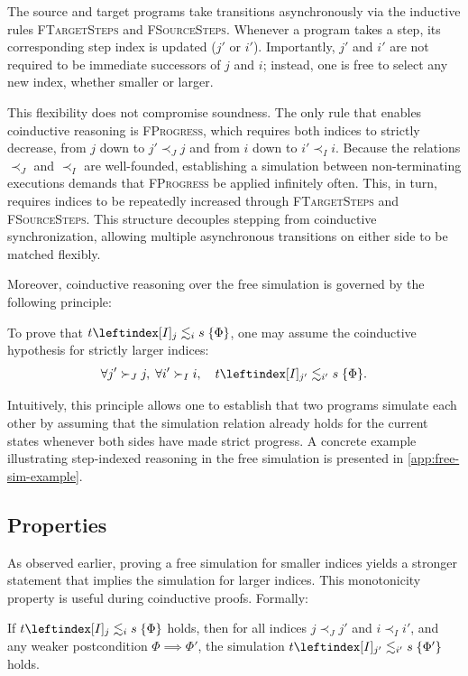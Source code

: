 \documentclass[report.tex]{subfiles}
\begin{document}
The source and target programs take transitions asynchronously
via the inductive rules \textsc{FTargetSteps} and \textsc{FSourceSteps}.
Whenever a program takes a step,
its corresponding step index is updated ($j'$ or $i'$).
Importantly,
$j'$ and $i'$ are not required to be
immediate successors of $j$ and $i$;
instead,
one is free to select any new index,
whether smaller or larger.

This flexibility does not compromise soundness.
The only rule that enables coinductive reasoning is \textsc{FProgress},
which requires both indices to strictly decrease,
from $j$ down to $j' \prec_J j$
and from $i$ down to $i' \prec_I i$.
Because the relations $\prec_J$ and $\prec_I$ are well-founded,
establishing a simulation between non-terminating executions
demands that \textsc{FProgress} be applied infinitely often.
This,
in turn,
requires indices to be repeatedly increased
through \textsc{FTargetSteps} and \textsc{FSourceSteps}.
This structure decouples stepping from coinductive synchronization,
allowing multiple asynchronous transitions
on either side to be matched flexibly.

Moreover,
coinductive reasoning over the free simulation
is governed by the following principle:
\begin{lemma}
  \label{lem:fsim-coind}
  To prove that $\fsim{t}{j}{i}{s}{\Phi}$,
  one may assume the coinductive hypothesis for strictly larger indices:
  \begin{equation*}
    \forall j' \succ_J j,\; \forall i' \succ_I i,\quad
    \fsim{t}{j'}{i'}{s}{\Phi}.
  \end{equation*}
\end{lemma}
Intuitively,
this principle allows one to establish
that two programs simulate each other
by assuming that the simulation relation already holds
for the current states whenever both sides have made strict progress.
A concrete example illustrating step-indexed reasoning
in the free simulation
is presented in \cref{app:free-sim-example}.

\subsection{Properties}

As observed earlier,
proving a free simulation for smaller indices
yields a stronger statement
that implies the simulation for larger indices.
This monotonicity property is useful during coinductive proofs.
Formally:
\begin{lemma}
  \label{lem:fsim-mono}
  If $\fsim{t}{j}{i}{s}{\Phi}$ holds,
  then for all indices $j \prec_J j'$ and $i \prec_I i'$,
  and any weaker postcondition $\Phi \implies \Phi'$,
  the simulation $\fsim{t}{j'}{i'}{s}{\Phi'}$ holds.
\end{lemma}
\end{document}
